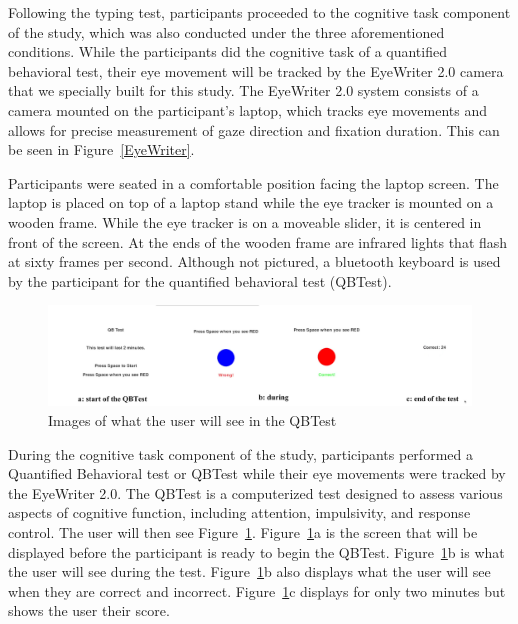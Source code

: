 \documentclass[manuscript, screen, review]{acmart} %
\begin{document}
Following the typing test, participants proceeded to the cognitive task component of the study, which was also conducted under the three aforementioned conditions. 
While the participants did the cognitive task of a quantified behavioral test, their eye movement will be tracked by the EyeWriter 2.0 camera that we specially built for this study. 
The EyeWriter 2.0 system consists of a camera mounted on the participant's laptop, which tracks eye movements and allows for precise measurement of gaze direction and fixation duration. This can be seen in Figure~\ref*{EyeWriter}.

Participants were seated in a comfortable position facing the laptop screen.
The laptop is placed on top of a laptop stand while the eye tracker is mounted on a wooden frame. 
While the eye tracker is on a moveable slider, it is centered in front of the screen. 
At the ends of the wooden frame are infrared lights that flash at sixty frames per second. %
Although not pictured, a bluetooth keyboard is used by the participant for the quantified behavioral test (QBTest).

\begin{figure}
  \includegraphics[width=\textwidth]{qbTest.png}
  \caption{Images of what the user will see in the QBTest}
  \label{QBTest}
\end{figure}

During the cognitive task component of the study, participants performed a Quantified Behavioral test or QBTest while their eye movements were tracked by the EyeWriter 2.0.
The QBTest is a computerized test designed to assess various aspects of cognitive function, including attention, impulsivity, and response control.
The user will then see Figure~\ref*{QBTest}. Figure~\ref*{QBTest}a is the screen that will be displayed before the participant is ready to begin the QBTest.
Figure~\ref*{QBTest}b is what the user will see during the test. Figure~\ref*{QBTest}b also displays what the user will see when they are correct and incorrect.
Figure~\ref*{QBTest}c displays for only two minutes but shows the user their score.
\end{document}
